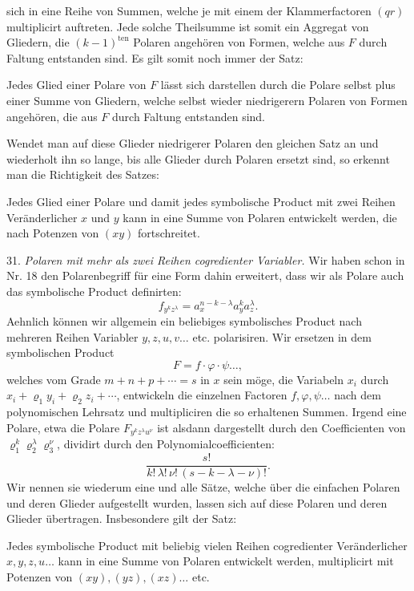 \documentclass[11pt]{article}
\providecommand{\gesperrt}[1]{\textls[130]{#1}}
\providecommand{\weberpage}[1]{}
\begin{document}
\weberpage{32}
sich in eine Reihe von Summen, welche je mit einem der Klammerfactoren $(qr)$ multiplicirt auftreten. Jede solche Theilsumme ist somit ein Aggregat von Gliedern, die $(k-1)^{\text{ten}}$ Polaren angehören von Formen, welche aus $F$ durch Faltung entstanden sind. Es gilt somit noch immer der Satz:

\glqq Jedes Glied einer Polare von $F$ lässt sich darstellen durch die Polare selbst plus einer Summe von Gliedern, welche selbst wieder niedrigerern Polaren von Formen angehören, die aus $F$ durch Faltung entstanden sind.\grqq{} %

Wendet man auf diese Glieder niedrigerer Polaren den gleichen Satz an und wiederholt ihn so lange, bis alle Glieder durch Polaren ersetzt sind, so erkennt man die Richtigkeit des Satzes:

\glqq Jedes Glied einer Polare und damit jedes symbolische Product mit zwei Reihen Veränderlicher $x$ und $y$ kann in eine Summe von Polaren entwickelt werden, die nach Potenzen von $(xy)$ fortschreitet.\grqq{}

31. \textit{Polaren mit mehr als zwei Reihen cogredienter Variabler.} Wir haben schon in Nr. 18 den Polarenbegriff für eine Form dahin erweitert, dass wir als Polare auch das symbolische Product definirten:
\[
f_{y^k z^{\lambda}} = a_x^{n-k-\lambda} a_y^k a_z^{\lambda} .
\]
Aehnlich können wir allgemein ein beliebiges symbolisches Product nach mehreren Reihen Variabler $y, z, u, v \ldots$ etc. polarisiren. Wir ersetzen in dem symbolischen Product
\[
F = f \cdot \varphi \cdot \psi \ldots ,
\]
welches vom Grade $m + n + p + \cdots = s$ in $x$ sein möge, die Variabeln $x_i$ durch $x_i + \varrho_1 y_i + \varrho_2 z_i + \cdots$, entwickeln die einzelnen Factoren $f, \varphi, \psi \ldots$ nach dem polynomischen Lehrsatz und multipliciren die so erhaltenen Summen. Irgend eine Polare, etwa die Polare $F_{y^k z^{\lambda} u^{\nu}}$ ist alsdann dargestellt durch den Coefficienten von $\varrho_1^k \varrho_2^{\lambda} \varrho_3^{\nu}$, dividirt durch den Polynomialcoefficienten:
\[
\frac{s!}{k! \, \lambda! \, \nu! \, (s-k-\lambda-\nu)!} .
\]
Wir nennen sie wiederum eine \gesperrt{gemischte Polare} und alle Sätze, welche über die einfachen Polaren und deren Glieder aufgestellt wurden, lassen sich auf diese Polaren und deren Glieder übertragen. Insbesondere gilt der Satz:

\glqq Jedes symbolische Product mit beliebig vielen Reihen cogredienter Veränderlicher $x, y, z, u \ldots$ kann in eine Summe von Polaren entwickelt werden, multiplicirt mit Potenzen von $(xy), (yz), (xz) \ldots$ etc.
\end{document}
